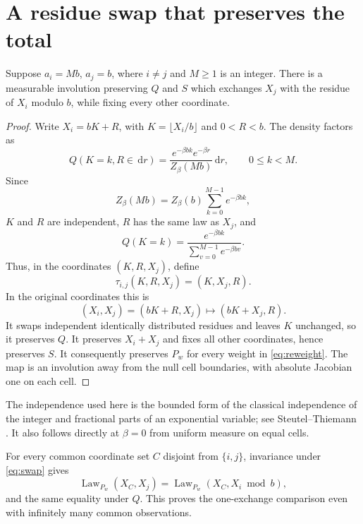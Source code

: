 \documentclass[11pt,a4paper]{article}
\theoremstyle{remark}\newtheorem*{ednote}{Editorial note (ProveIt, 2026-10-01)}
\newcommand{\Law}{\operatorname{Law}}\newcommand{\ind}{\mathbf1}
\newcommand{\dd}{\,\mathrm d}\newcommand{\ii}{\mathrm i}
\begin{document}
\section{A residue swap that preserves the total}
\begin{lemma}\label{lem:swap}
Suppose $a_i=Mb$, $a_j=b$, where $i\ne j$ and $M\ge1$ is an integer. There is a measurable involution preserving $Q$ and $S$ which exchanges $X_j$ with the residue of $X_i$ modulo $b$, while fixing every other coordinate.
\end{lemma}
\begin{proof}
Write $X_i=bK+R$, with $K=\lfloor X_i/b\rfloor$ and $0<R<b$. The density factors as
\[
 Q(K=k,R\in\dd r)=\frac{e^{-\beta bk}e^{-\beta r}}{Z_\beta(Mb)}\dd r,
 \qquad0\le k<M.
\]
Since
\[
 Z_\beta(Mb)=Z_\beta(b)\sum_{k=0}^{M-1}e^{-\beta bk},
\]
$K$ and $R$ are independent, $R$ has the same law as $X_j$, and
\begin{equation}\label{eq:digit}
 Q(K=k)=\frac{e^{-\beta bk}}{\sum_{v=0}^{M-1}e^{-\beta bv}}.
\end{equation}
Thus, in the coordinates $(K,R,X_j)$, define
\[
 \tau_{i,j}(K,R,X_j)=(K,X_j,R).
\]
In the original coordinates this is
\begin{equation}\label{eq:swap}
 (X_i,X_j)=(bK+R,X_j)\longmapsto(bK+X_j,R).
\end{equation}
It swaps independent identically distributed residues and leaves $K$ unchanged, so it preserves $Q$. It preserves $X_i+X_j$ and fixes all other coordinates, hence preserves $S$. It consequently preserves $P_w$ for every weight in \eqref{eq:reweight}. The map is an involution away from the null cell boundaries, with absolute Jacobian one on each cell.
\end{proof}
The independence used here is the bounded form of the classical independence of the integer and fractional parts of an exponential variable; see Steutel--Thiemann \cite[Lemma 1]{st}. It also follows directly at $\beta=0$ from uniform measure on equal cells.

For every common coordinate set $C$ disjoint from $\{i,j\}$, invariance under \eqref{eq:swap} gives
\begin{equation}\label{eq:oneswap}
 \Law_{P_w}(X_C,X_j)=\Law_{P_w}(X_C,X_i\bmod b),
\end{equation}
and the same equality under $Q$. This proves the one-exchange comparison even with infinitely many common observations.
\end{document}
